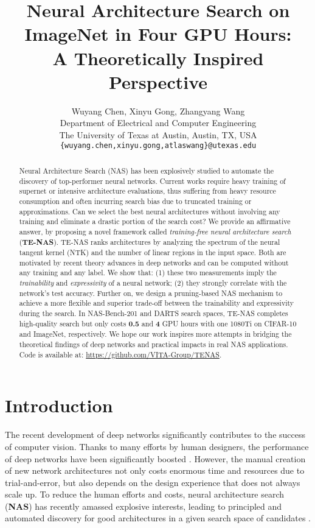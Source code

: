\documentclass{article} \usepackage{iclr2021_conference,times}
\title{Neural Architecture Search on ImageNet in Four GPU Hours: \\ A Theoretically Inspired Perspective}
\author{Wuyang Chen, Xinyu Gong, Zhangyang Wang
\\
Department of Electrical and Computer Engineering\\
The University of Texas at Austin, Austin, TX, USA \\
\texttt{\{wuyang.chen,xinyu.gong,atlaswang\}@utexas.edu} \\
}
\begin{document}
\maketitle
\vspace{-1em}
\begin{abstract}
Neural Architecture Search (NAS) has been explosively studied to automate the discovery of top-performer neural networks. Current works require heavy training of supernet or intensive architecture evaluations, thus suffering from heavy resource consumption and often incurring search bias due to truncated training or approximations. Can we select the best neural architectures without involving any training and eliminate a drastic portion of the search cost?
We provide an affirmative answer, by proposing a novel framework called \textit{training-free neural architecture search} (\textbf{TE-NAS}). TE-NAS ranks architectures by analyzing the spectrum of the neural tangent kernel (NTK) and the number of linear regions in the input space. Both are motivated by recent theory advances in deep networks and can be computed without any training and any label. We show that: (1) these two measurements imply the \textit{trainability} and \textit{expressivity} of a neural network; (2) they strongly correlate with the network's test accuracy. Further on, we design a pruning-based NAS mechanism to achieve a more flexible and superior trade-off between the trainability and expressivity during the search. In NAS-Bench-201 and DARTS search spaces, TE-NAS completes high-quality search but only costs \textbf{0.5} and \textbf{4} GPU hours with one 1080Ti on CIFAR-10 and ImageNet, respectively. We hope our work inspires more attempts in bridging the theoretical findings of deep networks and practical impacts in real NAS applications.
Code is available at: \url{https://github.com/VITA-Group/TENAS}.
\end{abstract}

\vspace{-1em}
\section{Introduction}
\vspace{-1em}
The recent development of deep networks significantly contributes to the success of computer vision. Thanks to many efforts by human designers, the performance of deep networks have been significantly boosted \citep{krizhevsky2012imagenet,simonyan2014very,szegedy2015going,he2016deep,xie2017aggregated}. However, the manual creation of new network architectures not only costs enormous time and resources due to trial-and-error, but also depends on the design experience that does not always scale up. 
To reduce the human efforts and costs, neural architecture search (\textbf{NAS}) has recently amassed explosive interests, leading to principled and automated discovery for good architectures in a given search space of candidates \citep{zoph2016neural,brock2017smash,pham2018efficient,liu2018progressive,chen2018searching,bender2018understanding,gong2019autogan,chen2020fasterseg,fu2020autogan}.
\end{document}
